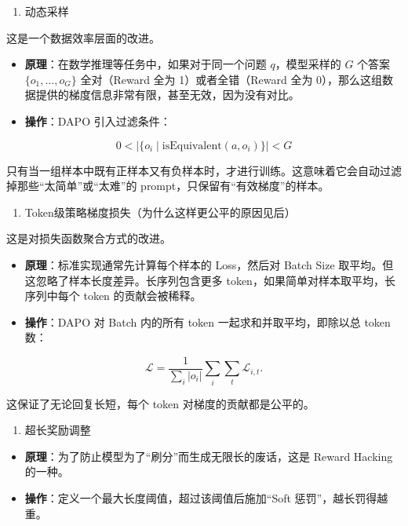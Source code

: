 \begin{enumerate}
\def\labelenumi{\arabic{enumi}.}
\setcounter{enumi}{1}
\tightlist
\item
  动态采样
\end{enumerate}

这是一个数据效率层面的改进。

\begin{itemize}
\tightlist
\item
  \textbf{原理}：在数学推理等任务中，如果对于同一个问题 \(q\)，模型采样的 \(G\) 个答案 \(\{o_1,\ldots,o_G\}\) 全对（Reward 全为 1）或者全错（Reward 全为 0），那么这组数据提供的梯度信息非常有限，甚至无效，因为没有对比。
\item
  \textbf{操作}：DAPO 引入过滤条件：
\end{itemize}

\[
0 < \left|\{o_i \mid \mathrm{isEquivalent}(a,o_i)\}\right| < G
\]

只有当一组样本中既有正样本又有负样本时，才进行训练。这意味着它会自动过滤掉那些``太简单''或``太难''的 prompt，只保留有``有效梯度''的样本。

\begin{enumerate}
\def\labelenumi{\arabic{enumi}.}
\setcounter{enumi}{2}
\tightlist
\item
  Token级策略梯度损失（为什么这样更公平的原因见后）
\end{enumerate}

这是对损失函数聚合方式的改进。

\begin{itemize}
\tightlist
\item
  \textbf{原理}：标准实现通常先计算每个样本的 Loss，然后对 Batch Size 取平均。但这忽略了样本长度差异。长序列包含更多 token，如果简单对样本取平均，长序列中每个 token 的贡献会被稀释。
\item
  \textbf{操作}：DAPO 对 Batch 内的所有 token 一起求和并取平均，即除以总 token 数：
\end{itemize}

\[
\mathcal{L}
=
\frac{1}{\sum_i |o_i|}
\sum_i \sum_t \mathcal{L}_{i,t}.
\]

这保证了无论回复长短，每个 token 对梯度的贡献都是公平的。

\begin{enumerate}
\def\labelenumi{\arabic{enumi}.}
\setcounter{enumi}{3}
\tightlist
\item
  超长奖励调整
\end{enumerate}

\begin{itemize}
\tightlist
\item
  \textbf{原理}：为了防止模型为了``刷分''而生成无限长的废话，这是 Reward Hacking 的一种。
\item
  \textbf{操作}：定义一个最大长度阈值，超过该阈值后施加``Soft 惩罚''，越长罚得越重。
\end{itemize}

